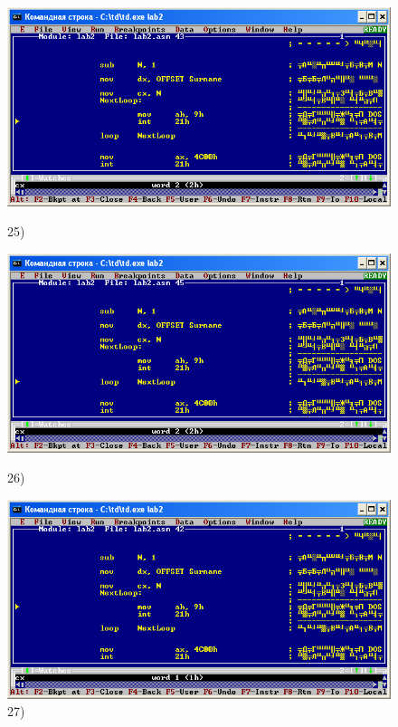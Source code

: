 \begin{figure}[!htp]
    \centering
    \begin{minipage}{0.32\textwidth}
        \centering
        \includegraphics[width=.99\linewidth]
            {../_INCLUDES/task-4-14/25.png}
        \caption{25) }
        \label{fig:task_4_14__25}
    \end{minipage}
    \begin {minipage}{0.32\textwidth}
        \centering
        \includegraphics[width=.99\linewidth]
            {../_INCLUDES/task-4-14/26.png}
        \caption{26) }
        \label{fig:task_4_14__26}
    \end{minipage}
    \begin {minipage}{0.32\textwidth}
        \centering
        \includegraphics[width=.99\linewidth]
            {../_INCLUDES/task-4-14/27.png}
        \caption{27) }
        \label{fig:task_4_14__27}
    \end{minipage}
\end{figure}

